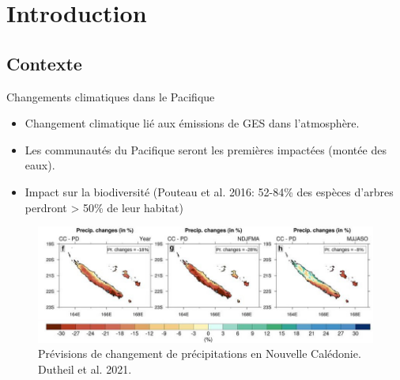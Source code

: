 \documentclass[10pt,table,dvipsnames,compress]{beamer}
\begin{document}
\section{Introduction}
\label{sec:org29993e1}

\subsection{Contexte}
\label{sec:org6c863b8}

\begin{frame}[label={sec:org6b85bd6}]{Changements climatiques dans le Pacifique}
\begin{itemize}
\item Changement climatique lié aux émissions de GES dans l'atmosphère.
\item Les communautés du Pacifique seront les premières impactées (montée des eaux).
\item Impact sur la biodiversité (Pouteau et al. 2016: 52-84\% des espèces d'arbres perdront > 50\% de leur habitat)
\end{itemize}

\begin{figure}[htbp]
\centering
\includegraphics[width=\textwidth]{figs/Dutheil2021_cc.jpg}
\caption{Prévisions de changement de précipitations en Nouvelle Calédonie. Dutheil et al. 2021.}
\end{figure}
\end{frame}
\end{document}
